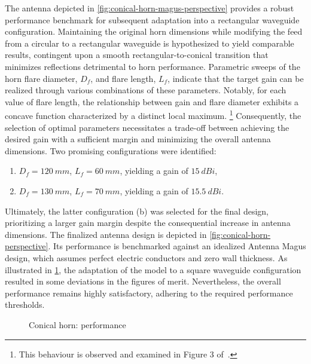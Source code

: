 \documentclass[11pt,a4paper,twoside,openany]{report}
\begin{document}
The antenna depicted in \cref{fig:conical-horn-magus-perspective} provides a robust performance benchmark for subsequent adaptation into a rectangular waveguide configuration.  Maintaining the original horn dimensions while modifying the feed from a circular to a rectangular waveguide is hypothesized to yield comparable results, contingent upon a smooth rectangular-to-conical transition that minimizes reflections detrimental to horn performance. Parametric sweeps of the horn flare diameter, $D_f$, and flare length, $L_f$, indicate that the target gain can be realized through various combinations of these parameters. Notably, for each value of flare length, the relationship between gain and flare diameter exhibits a concave function characterized by a distinct local maximum.%
    \footnote{This behaviour is observed and examined in Figure 3 of~\parencite{aboserwal-et-al:conical-horn-gain-and-amplitude-patterns}.}
Consequently, the selection of optimal parameters necessitates a trade-off between achieving the desired gain with a sufficient margin and minimizing the overall antenna dimensions. Two promising configurations were identified:
\begin{enumerate}[label=(\alph*)]
    \item $D_f = \qty{120}{mm}$, $L_f = \qty{60}{mm}$, yielding a gain of $\qty{15}{dBi}$,
    \item $D_f = \qty{130}{mm}$, $L_f = \qty{70}{mm}$, yielding a gain of $\qty{15.5}{dBi}$.
\end{enumerate}
Ultimately, the latter configuration (b) was selected for the final design, prioritizing a larger gain margin despite the consequential increase in antenna dimensions. The finalized antenna design is depicted in \cref{fig:conical-horn-perspective}. Its performance is benchmarked against an idealized Antenna Magus design, which assumes perfect electric conductors and zero wall thickness. As illustrated in \cref{fig:conical-horn-performance-comparison}, the adaptation of the model to a square waveguide configuration resulted in some deviations in the figures of merit. Nevertheless, the overall performance remains highly satisfactory, adhering to the required performance thresholds.

\begin{figure}[!ht]
    \centering
    
    \caption{\label{fig:conical-horn-performance-comparison}Conical horn: performance}
\end{figure}
\end{document}
